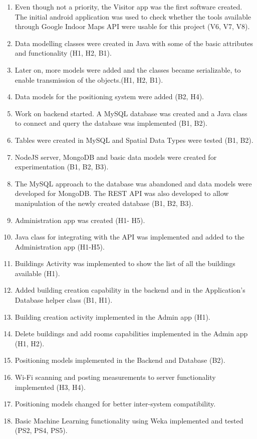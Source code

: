 \begin{enumerate}
	\item Even though not a priority, the Visitor app was the first software created. The initial android application was used to check whether the tools available through Google Indoor Maps API were usable for this project (V6, V7, V8).
	\item Data modelling classes were created in Java with some of the basic attributes and functionality (H1, H2, B1).
	\item Later on, more models were added and the classes became serializable, to enable transmission of the objects.(H1, H2, B1).
	\item Data models for the positioning system were added (B2, H4).
	\item Work on backend started. A MySQL database was created and a Java class to connect and query the database was implemented (B1, B2).
	\item Tables were created in MySQL and Spatial Data Types were tested (B1, B2).
	\item NodeJS server, MongoDB and basic data models were created for experimentation (B1, B2, B3).
	\item The MySQL approach to the database was abandoned and data models were developed for MongoDB. The REST API was also developed to allow manipulation of the newly created database (B1, B2, B3).
	\item  Administration app was created (H1- H5).
	\item Java class for integrating with the API was implemented and added to the Administration app (H1-H5).
	\item Buildings Activity was implemented to show the list of all the buildings available (H1).
	\item Added building creation capability in the backend and in the Application's Database helper class (B1, H1).
	\item Building creation activity implemented in the Admin app (H1).
	\item Delete buildings and add rooms capabilities implemented in the Admin app (H1, H2).
	\item Positioning models implemented in the Backend and Database (B2).
	\item Wi-Fi scanning and posting measurements to server functionality implemented (H3, H4). 
	\item Positioning models changed for better inter-system compatibility.
	\item Basic Machine Learning functionality using Weka implemented and tested (PS2, PS4, PS5).

\end{enumerate}
